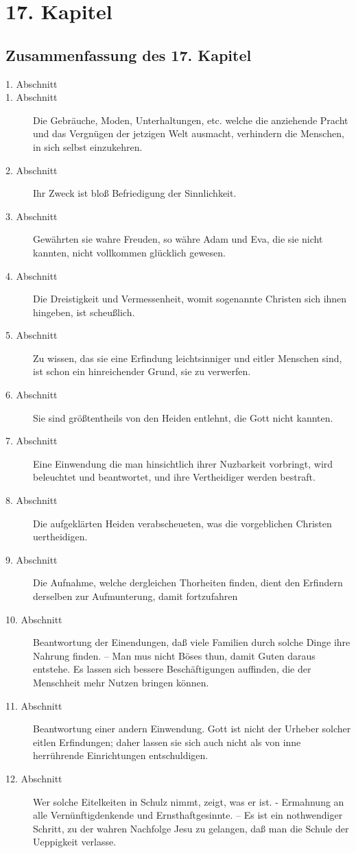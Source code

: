 
\chapter{17. Kapitel} \label{kap17}
\section{Zusammenfassung des 17. Kapitel}
\small
\begin{description}
\item[1. Abschnitt]
\item[1. Abschnitt] Die Gebräuche, Moden, Unterhaltungen, etc. welche die anziehende Pracht und das Vergnügen der jetzigen Welt ausmacht, verhindern die Menschen, in sich selbst einzukehren.
\item[2. Abschnitt] Ihr Zweck ist bloß Befriedigung der Sinnlichkeit.
\item[3. Abschnitt] Gewährten sie wahre Freuden, so währe Adam und Eva, die sie nicht kannten, nicht vollkommen glücklich gewesen.
\item[4. Abschnitt] Die Dreistigkeit und Vermessenheit, womit sogenannte Christen sich ihnen hingeben, ist scheußlich.
\item[5. Abschnitt] Zu wissen, das sie eine Erfindung leichtsinniger und eitler Menschen sind, ist schon ein hinreichender Grund, sie zu verwerfen.
\item[6. Abschnitt] Sie sind größtentheils von den Heiden entlehnt, die Gott nicht kannten.
\item[7. Abschnitt] Eine Einwendung die man hinsichtlich ihrer Nuzbarkeit vorbringt, wird beleuchtet und beantwortet, und ihre Vertheidiger werden bestraft.
\item[8. Abschnitt] Die aufgeklärten Heiden verabscheueten, was die vorgeblichen Christen uertheidigen.
\item[9. Abschnitt] Die Aufnahme, welche dergleichen Thorheiten finden, dient den Erfindern derselben zur Aufmunterung, damit fortzufahren
\item[10. Abschnitt] Beantwortung der Einendungen, daß viele Familien durch solche Dinge ihre Nahrung finden. -- Man mus nicht Böses thun, damit Guten daraus entstehe. Es lassen sich bessere Beschäftigungen auffinden, die der Menschheit mehr Nutzen bringen können.
\item[11. Abschnitt] Beantwortung einer andern Einwendung. Gott ist nicht der Urheber solcher eitlen Erfindungen; daher lassen sie sich auch nicht als von inne herrührende Einrichtungen entschuldigen.
\item[12. Abschnitt] Wer solche Eitelkeiten in Schulz nimmt, zeigt, was er ist. - Ermahnung an alle Vernünftigdenkende und Ernsthaftgesinnte. -- Es ist ein nothwendiger Schritt, zu der wahren Nachfolge Jesu zu gelangen, daß man die Schule der Ueppigkeit verlasse.

\end{description}
\normalsize

